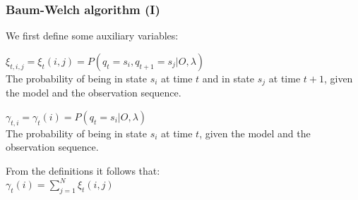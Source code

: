 \begin{frame}[t]
	\frametitle{Baum-Welch algorithm (I)}
	\pause
	We first define some auxiliary variables:
	
	\begin{block}{}    
    	$\xi_{t,i,j} = \xi_t(i,j) = P(q_t=s_i,q_{t+1}=s_j \vert O, \lambda)$\\
    	The probability of being in state $s_i$ at time $t$ and in state $s_j$ at time $t+1$, given
    	the model and the observation sequence.
	\end{block}
	\pause
	
	\begin{block}{}    
    	$ \gamma_{t,i} = \gamma_t(i) = P(q_t = s_i \vert O, \lambda)$\\
    	The probability of being in state $s_i$ at time $t$, given the model and the observation sequence.
	\end{block}
	\vspace*{1em}
	\pause
	
	From the definitions it follows that:\\
	$ \gamma_t(i) = \displaystyle\sum_{j=1}^{N}\xi_t(i,j)$
  	
\end{frame}

